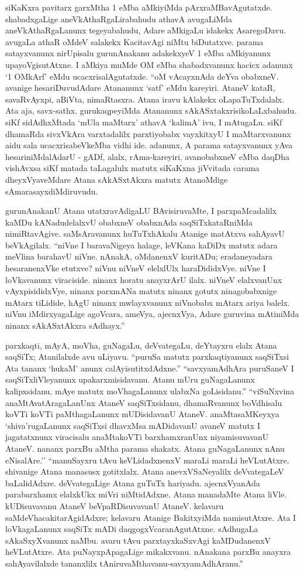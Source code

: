 siKaKxra pavitarx garxMtha {\rm 1} eMba aMkiyiMda pArxraMBavAgutatxde. shabadxgaLige aneVkAthaRgaLirabahudu athavA avugaLiMda aneVkAthaRgaLanunx tegeyabahudu, Adare aMkigaLu idakekx AsaregoDavu. avugaLa athaR oMdeV salakekx KacitavAgi niMtu biDutatxve. parama satayxvanunx nirUpisalu gurunAnakanu adakekxyeV {\rm 1} eMba aMkiyanunx upayoVgisutAtxne. I aMkiya muMde OM eMba shabadxvanunx hacicx adanunx `{\rm 1} OMkArf' eMdu ucacxrisalAgutatxde. ``oM vAcayxnAda deYva obabxneV. avanige hesariDuvudAdare Atananunx `satf' eMdu kareyiri. AtaneV kataR, savaRvAyxpi, aBiVta, nimaRtasxra. Atana iravu kAlakekx oLapaTuTxdalalx. Ata aja, savx-sathx. gurukaqpeyiMda Atananunx sAkASxtakxrisikoLaLxbahudu. siKf sidAdhxMtada `mUla maMtarx' athavA `kalimA' ivu, I mAtugaLu. siKf dhamaRda sivxVkAra varxtadalilx parxtiyobabx vayxkitxyU I maMtarxvanunx aidu sala ucacxrisabeVkeMba vidhi ide. adanunx, A parama satayxvanunx yAva hesariniMdalAdarU - gADf, alalx, rAma-kareyiri, avanobabxneV eMba daqDha vishAvxsa siKf matada taLagalulx matutx siKaKxna jiVvitada carama dheyxVyaveMdare Atana sAkASxtAkxra matutx AtanoMdige sAmarasayxdiMdiruvudu.

gurunAnakanU Atana utatxravAdigaLU BAvisiruvaMte, I parxpaMcadalilx kaMDu kANadudelalxvU obabxneV obabxnAda saqSiTxkataRniMda nimiRtavAgive. saMsAravanunx huTuTxhAkalu Atanige matAtxva sahAyavU beVkAgilalx. ``niVne I baravaNigeya halage, leVKana kaDiDx matutx adara meVlina barahavU niVne. nAnakA, oMdanenxV kuritADu; eradaneyadara hesaranenxVke etutxve? niVnu niVneV elelxlUlx haraDididxVye. niVne I loVkavanunx viraciside. ninanx horatu anayxrArU ilalx. niVneV elalxvanUnx vAyxpisididxVye, ninanx parxmANa matutx ninanx gotutx ninagobabxnige mAtarx tiLidide, hAgU ninanx mwlayxvanunx niVnobabx mAtarx ariya balelx. niVnu iMdirxyagaLige agoVcara, ameVya, ajecnxVya, Adare guruvina mAtiniMda ninanx sAkASxtAkxra sAdhayx.''

parxkaqti, mAyA, moVha, guNagaLu, deVvategaLu, deYtayxru elalx Atana saqSiTx; Atanilalxde avu uLiyavu. ``puruSa matutx parxkaqtiyanunx saqSiTxsi Ata tananx `hukaM' anunx calAyisutitxdAdxne.'' ``savxyamAdhAra puruSaneV I saqSiTxliVleyanunx upakarxmisidavanu. Atanu mUru guNagaLanunx kalipxsidanu, mAye matutx moVhagaLanunx ulabxNa goLisidanu.'' ``viSuNxvina anaMtAvatAragaLanUnx AtaneV saqSiTxsidanu, dhamaRvanunx boVdhisalu koVTi koVTi paMthagaLanunx mUDisidavanU AtaneV. anaMtasaMKeyxya `shiva'rugaLanunx saqSiTxsi dhavxMsa mADidavanU avaneV matutx I jagatatxnunx viracisalu anaMtakoVTi barxhamxranUnx niyamisuvavanU AtaneV. nananx parxBu aMtha parama shakatx. Atana guNagaLanunx nAnu eNisalAre.'' ``manuSayxru tAvu keVLidadxnenxV maraLi maraLi heVLutAtxre. shivanige Atana manasusx gotitxlalx. Atana anevxVSaNeyalilx deVvategaLeV baLalidAdxre. deVvategaLige Atana guTuTx hariyadu. ajecnxVyanAda parabarxhamx elalxkUkx miVri niMtidAdxne. Atana manadaMte Atana liVle. kUDisuvavanu AtaneV beVpaRDisuvavanU AtaneV. kelavaru saMdeVhacakitarAgidAdxre; kelavaru Atanige BakitxyiMda namisutAtxre. Ata I loVkagaLanunx  saqSiTx mADi daqgogxVcaranAgutAtxne. sAdhugaLa sAkaSxyXvanunx naMbu. avaru tAvu parxtayxkaSxvAgi kaMDudanenxV heVLutAtxre. Ata puNayxpApagaLige mikakxvanu. nAnakana parxBu anayxra sahAyavilalxde tananxlilx tAniruvaMthavanu-savxyamAdhAranu.''

